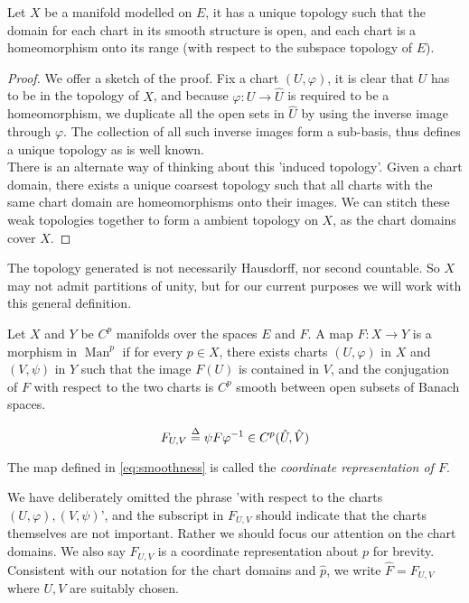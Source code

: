 \documentclass[../main-manifolds.tex]{subfiles}
\begin{document}
\begin{wts}
    Let $X$ be a manifold modelled on $E$, it has a unique topology such that the domain for each chart in its smooth structure is open, and each chart is a homeomorphism onto its range (with respect to the subspace topology of $E$).
\end{wts}
\begin{proof}
    We offer a sketch of the proof. Fix a chart $(U,\varphi)$, it is clear that $U$ has to be in the topology of $X$, and because $\varphi: U\to \hat{U}$ is required to be a homeomorphism, we duplicate all the open sets in $\hat{U}$ by using the inverse image through $\varphi$. The collection of all such inverse images form a sub-basis, thus defines a unique topology as is well known.\\

    There is an alternate way of thinking about this 'induced topology'. Given a chart domain, there exists a unique coarsest topology such that all charts with the same chart domain are homeomorphisms onto their images. We can stitch these weak topologies together to form a ambient topology on $X$, as the chart domains cover $X$.
\end{proof}
\begin{remark}
    The topology generated is not necessarily Hausdorff, nor second countable. So $X$ may not admit partitions of unity, but for our current purposes we will work with this general definition.
\end{remark}
\begin{definition}\label{def:smoothness}
Let $X$ and $Y$ be $C^p$ manifolds over the spaces $E$ and $F$. A map $F: X\to Y$ is a morphism in $\operatorname{Man}^p$ if for every $p\in X$, there exists charts $(U,\varphi)$ in $X$ and $(V,\psi)$ in $Y$ such that the image $F(U)$ is contained in $V$, and the conjugation of $F$ with respect to the two charts is $C^p$ smooth between open subsets of Banach spaces.

\begin{equation}\label{eq:smoothness}
    F_{U,V}\overset{\Delta}{=} \psi F \varphi^{-1} \in C^p(\hat{U},\hat{V})    
\end{equation}

The map defined in \cref{eq:smoothness} is called the \emph{coordinate representation of $F$}.
\end{definition}
\begin{remark}
    We have deliberately omitted the phrase 'with respect to the charts $(U,\varphi), (V,\psi)$', and the subscript in $F_{U,V}$ should indicate that the charts themselves are not important. Rather we should focus our attention on the chart domains. We also say $F_{U,V}$ is a coordinate representation about $p$ for brevity. Consistent with our notation for the chart domains and $\hat{p}$, we write $\hat{F} = F_{U,V}$ where $U,V$ are suitably chosen.
\end{remark}
\end{document}
